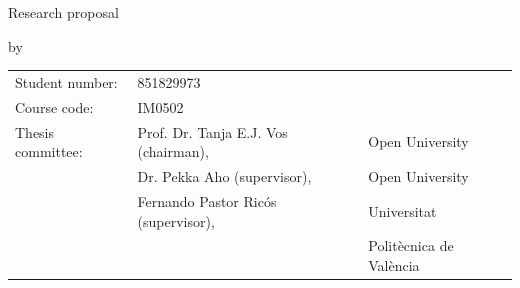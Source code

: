 
\pagestyle{plain}
\begin{titlepage}
    \begin{center}
    
        
        \vspace*{2\bigskipamount}
        
        {\color{red}\Huge\bf \mytitle}
        \bigskip
        
        {\large Research proposal}
        
        \bigskip \bigskip
        by
        \bigskip \bigskip
        
        {\Large\bf \myauthor}
        
        \bigskip \bigskip\bigskip \bigskip
        
        \begin{tabular}{lll}
            Student number: & 851829973 \\
            Course code: & \textsc{IM}0502\\
            Thesis committee:
                & Prof. Dr. Tanja E.J. Vos (chairman), & Open University \\
                & Dr. Pekka Aho (supervisor), & Open University \\
                & Fernando Pastor Ricós (supervisor), & Universitat \\
                &  & Politècnica de València
        \end{tabular}
    
    \end{center}
\end{titlepage}


\let\cleardoublepage\clearpage